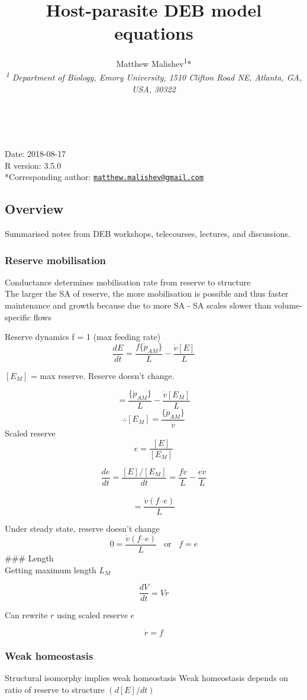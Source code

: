 \documentclass[10,portrait]{article}
\title{Host-parasite DEB model equations}
\author{Matthew
Malishev\textsuperscript{1}*\\[2\baselineskip]\emph{\textsuperscript{1}
Department of Biology, Emory University, 1510 Clifton Road NE, Atlanta,
GA, USA, 30322}}
\date{}
\begin{document}
\maketitle

{
\hypersetup{linkcolor=black}
\setcounter{tocdepth}{3}
\tableofcontents
}
~

Date: 2018-08-17\\
R version: 3.5.0\\
*Corresponding author:
\href{mailto:matthew.malishev@gmail.com}{\nolinkurl{matthew.malishev@gmail.com}}

\newpage  

\subsection{Overview}\label{overview}

Summarised notes from DEB workshops, telecourses, lectures, and
discussions.

\subsubsection{Reserve mobilisation}\label{reserve-mobilisation}

Conductance determines mobilisation rate from reserve to structure\\
The larger the SA of reserve, the more mobilisation is possible and thus
faster maintenance and growth because due to more SA - SA scales slower
than volume-specific flows

Reserve dynamics f = 1 (max feeding rate)\\
\[
\frac
  {d E}
  {d t}  
  = \frac
  {f\{\dot{p}_{AM}\}}
  {L}  
  - \frac  
  {\dot{v}[E]}  
  {L}   
\]

\([E_{M}]\) = max reserve. Reserve doesn't change.

\[
= \frac
  {\{\dot{p}_{AM}\}}
  {L} - 
  \frac
  {\dot{v}[E_{M}]}
  {L}    
\] \[
\therefore 
[E_{M}]
= \frac
  {\{\dot{p}_{AM}\}}
  {\dot{v}}
\] Scaled reserve \[
e =
\frac
{[E]}
{[E_{M}]}  
\]

\[
\frac
{de}
{dt}
= \frac
{[E] /[E_{M}]}
{dt} 
= \frac
{f\dot{v}}
{L}  - 
\frac
{e\dot{v}}
{L}     
\]\\
\[
= \frac
{\dot{v} (f – e)}
{L} 
\]

Under steady state, reserve doesn't change\\
\[
0 =
\frac
{\dot{v} (f – e)}
{L}
\ \ \ \
\text{or}
\ \ \ \ f = e
\] \#\#\# Length\\
Getting maximum length \(L_{M}\)

\[
\frac
{dV}
{dt}
= V\dot{r}  
\]

Can rewrite \(r\) using scaled reserve \(e\)

\[
\dot{r} = f
\]

\subsubsection{Weak homeostasis}\label{weak-homeostasis}

Structural isomorphy implies weak homeostasis Weak homeostasis depends
on ratio of reserve to structure \((d[E] / dt)\)

\printbibliography
\end{document}
